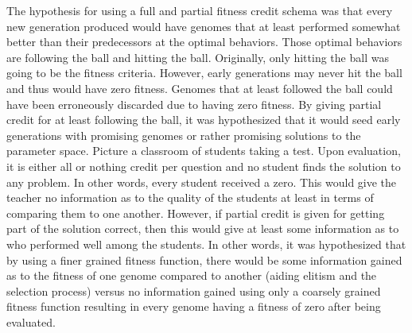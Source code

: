 \documentclass[a4paper,10pt]{article}
\begin{document}
The hypothesis for using a full and partial fitness credit schema was that every new generation produced would have genomes that at least performed somewhat better than their predecessors at the optimal behaviors. Those optimal behaviors are following the ball and hitting the ball. Originally, only hitting the ball was going to be the fitness criteria. However, early generations may never hit the ball and thus would have zero fitness. Genomes that at least followed the ball could have been erroneously discarded due to having zero fitness. By giving partial credit for at least following the ball, it was hypothesized that it would seed early generations with promising genomes or rather promising solutions to the parameter space. Picture a classroom of students taking a test. Upon evaluation, it is either all or nothing credit per question and no student finds the solution to any problem. In other words, every student received a zero. This would give the teacher no information as to the quality of the students at least in terms of comparing them to one another. However, if partial credit is given for getting part of the solution correct, then this would give at least some information as to who performed well among the students. In other words, it was hypothesized that by using a finer grained fitness function, there would be some information gained as to the fitness of one genome compared to another (aiding elitism and the selection process) versus no information gained using only a coarsely grained fitness function resulting in every genome having a fitness of zero after being evaluated.
\end{document}
